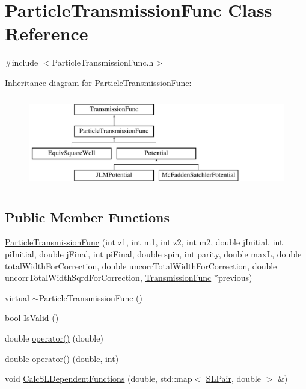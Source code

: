 \hypertarget{classParticleTransmissionFunc}{\section{Particle\-Transmission\-Func Class Reference}
\label{classParticleTransmissionFunc}
}


{\ttfamily \#include $<$Particle\-Transmission\-Func.\-h$>$}

Inheritance diagram for Particle\-Transmission\-Func\-:\begin{figure}[H]
\begin{center}
\leavevmode
\includegraphics[height=4.000000cm]{d3/df3/classParticleTransmissionFunc}
\end{center}
\end{figure}
\subsection*{Public Member Functions}
\begin{DoxyCompactItemize}
\item 
\hyperlink{classParticleTransmissionFunc_a73fb78cabd594e804225c60fb6b1061f}{Particle\-Transmission\-Func} (int z1, int m1, int z2, int m2, double j\-Initial, int pi\-Initial, double j\-Final, int pi\-Final, double spin, int parity, double max\-L, double total\-Width\-For\-Correction, double uncorr\-Total\-Width\-For\-Correction, double uncorr\-Total\-Width\-Sqrd\-For\-Correction, \hyperlink{classTransmissionFunc}{Transmission\-Func} $\ast$previous)
\item 
virtual \hyperlink{classParticleTransmissionFunc_a9731c8c88dbd868583d286fb2a51df92}{$\sim$\-Particle\-Transmission\-Func} ()
\item 
bool \hyperlink{classParticleTransmissionFunc_a4bfae205a7c0fed1c590b4fd7f843443}{Is\-Valid} ()
\item 
double \hyperlink{classParticleTransmissionFunc_a9130fbae97d96592ae6d493607e801d4}{operator()} (double)
\item 
double \hyperlink{classParticleTransmissionFunc_aa9ae316a1b1d98084c88564b6faa5360}{operator()} (double, int)
\item 
void \hyperlink{classParticleTransmissionFunc_a0360cd28e5901a772c047d1893e6cb9d}{Calc\-S\-L\-Dependent\-Functions} (double, std\-::map$<$ \hyperlink{classSLPair}{S\-L\-Pair}, double $>$ \&)
\end{DoxyCompactItemize}

